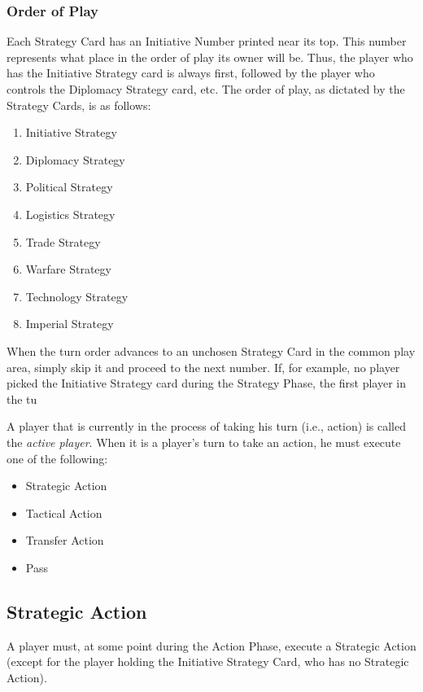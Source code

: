 \documentclass[11pt,fleqn]{book} %
\begin{document}
\subsubsection{Order of Play}
Each Strategy Card has an Initiative Number printed near its top. This number represents what place in the order of play its owner will be. Thus, the player who has the Initiative Strategy card is always first, followed by the player who controls the Diplomacy Strategy card, etc. The order of play, as dictated by the Strategy Cards, is as follows:
\begin{enumerate}
    \item Initiative Strategy
    \item Diplomacy Strategy
    \item Political Strategy
    \item Logistics Strategy
    \item Trade Strategy
    \item Warfare Strategy
    \item Technology Strategy
    \item Imperial Strategy
\end{enumerate}

When the turn order advances to an unchosen Strategy Card in the common play area, simply skip it and proceed to the next number. If, for example, no player picked the Initiative Strategy card during the Strategy Phase, the first player in the tu

A player that is currently in the process of taking his turn (i.e., action) is called the \emph{active player}. When it is a player's turn to take an action, he must execute one of the following:
\begin{itemize}
\item Strategic Action
\item Tactical Action
\item Transfer Action
\item Pass 
\end{itemize}


\subsection{Strategic Action} %
\label{sub:strategic_action}
A player must, at some point during the Action Phase, execute a Strategic Action (except for the player holding the Initiative Strategy Card, who has no Strategic Action).
\end{document}
